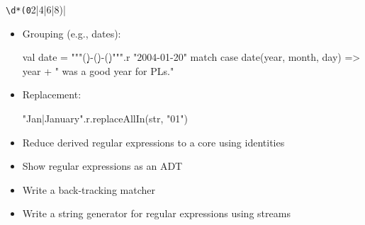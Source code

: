 \verb|\d*(0|2|4|6|8)|

\begin{instructor}
\begin{itemize}

\item Grouping (e.g., dates):

\begin{scalacode}
    val date = """(\d\d\d\d)-(\d\d)-(\d\d)""".r
    "2004-01-20" match {
      case date(year, month, day) => year + " was a good year for PLs."
    }
\end{scalacode}

\item Replacement:

\begin{scalacode}
"Jan|January".r.replaceAllIn(str, "01")
\end{scalacode}

\item Reduce derived regular expressions to a core using identities
\item Show regular expressions as an ADT
\item Write a back-tracking matcher
\item Write a string generator for regular expressions using streams
\end{itemize}
\end{instructor}